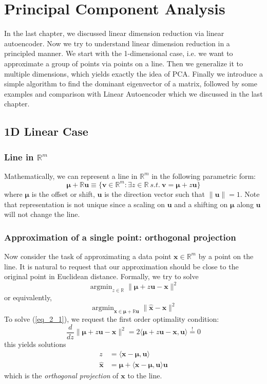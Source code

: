 \documentclass[../book-template.tex]{subfiles}
\begin{document}
\chapter{Principal Component Analysis}
In the last chapter, we discussed linear dimension reduction via linear autoencoder. Now we try to understand linear dimension reduction in a principled manner. We start with the 1-dimensional case, i.e. we want to approximate a group of points via points on a line. Then we generalize it to multiple dimensions, which yields exactly the idea of PCA. Finally we introduce a simple algorithm to find the dominant eigenvector of a matrix, followed by some examples and comparison with Linear Autoencoder which we discussed in the last chapter.

\section{1D Linear Case}
\subsection{Line in \texorpdfstring{$\mathbb{R}^m$}{Rm}}
Mathematically, we can represent a line in $\mathbb{R}^m$ in the following parametric form:
\begin{equation*}
    \bm{\mu} + \mathbb{R}\bm{u} \equiv \{\bm{v}\in \mathbb{R}^m:\exists z\in \mathbb{R}\ s.t.\ \bm{v}=\bm{\mu} + z\bm{u} \}
\end{equation*}
where $\bm{\mu}$ is the offset or shift, $\bm{u}$ is the direction vector such that $\|\bm{u}\|=1$. Note that representation is not unique since a scaling on $\bm{u}$ and a shifting on $\bm{\mu}$ along $\bm{u}$ will not change the line. 

\subsection{Approximation of a single point: orthogonal projection}
Now consider the task of approximating a data point $\bm{x}\in\mathbb{R}^m$ by a point on the line. It is natural to request that our approximation should be close to the original point in Euclidean distance. Formally, we try to solve
\begin{equation}\label{eq_2_1}
    \mathop{\arg\min}_{z\in\mathbb{R}}\|\bm{\mu}+z\bm{u}-\bm{x}\|^2
\end{equation}
or equivalently,
\begin{equation*}
    \mathop{\arg\min}_{\hat{\bm{x}}\in \bm{\mu} + \mathbb{R}\bm{u}}\|\hat{\bm{x}}-\bm{x}\|^2
\end{equation*}
To solve (\ref{eq_2_1}), we request the first order optimality condition:
\begin{equation*}
    \frac{d}{dz}\|\bm{\mu}+z\bm{u}-\bm{x}\|^2 = 2\langle \bm{\mu}+z\bm{u}-\bm{x}, \bm{u}\rangle \overset{!}{=}0
\end{equation*}
this yields solutions
\begin{align*}
    z &= \langle \bm{x}-\bm{\mu},\bm{u} \rangle\\
    \hat{\bm{x}} &= \bm{\mu} + \langle \bm{x}-\bm{\mu},\bm{u} \rangle \bm{u}
\end{align*}
which is the \emph{orthogonal projection} of $\bm{x}$ to the line. 
\end{document}
